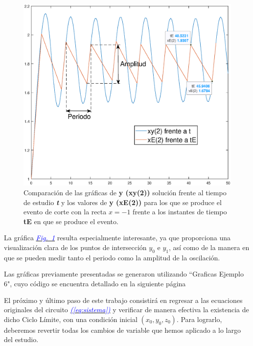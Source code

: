 \documentclass[12pt,a4paper]{report} %
\newcommand{\fref}[1]{\hyperref[#1]{\textcolor{blue}{\textit{Fig.~\ref*{#1}}}}}
\newcommand{\eref}[1]{\hyperref[#1]{\textcolor{blue}{\textit{(\ref*{#1})}}}}
\begin{document}
	\begin{figure}[h]
		\centering
		\includegraphics[width=1\textwidth]{g3ejem6.eps}
		\caption{Comparación de las gráficas de \textbf{y (xy(2))} solución frente al tiempo de estudio \textit{\textbf{t}} y los valores de \textbf{y (xE(2))} para los que se produce el evento de corte con la recta $x=-1$ frente a los instantes de tiempo \textbf{tE} en que se produce el evento.}
		\label{fig:g3ejem6}
	\end{figure}\smallskip
	
	\vspace{0.5cm}\noindent La gráfica \fref{fig:g3ejem6} resulta especialmente interesante, ya que proporciona una visualización clara de los puntos de intersección $y_0$ e $y_1$, así como de la manera en que se pueden medir tanto el periodo como la amplitud de la oscilación.
	
	\vspace{0.5cm}\noindent Las gráficas previamente presentadas se generaron utilizando ``Graficas Ejemplo 6", cuyo código se encuentra detallado en la siguiente página
	
	\newpage
	
	\vspace{0.5cm}
	
	\newpage
	
	El próximo y último paso de este trabajo consistirá en regresar a las ecuaciones originales del circuito \eref{eq:sistema} y verificar de manera efectiva la existencia de dicho Ciclo Límite, con una condición inicial $(x_0,y_0,z_0)$. Para lograrlo, deberemos revertir todas los cambios de variable que hemos aplicado a lo largo del estudio. 
	
\end{document}
